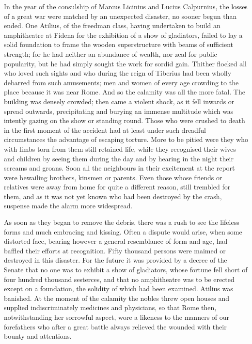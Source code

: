 In the year of the consulship of Marcus Licinius and Lucius Calpurnius, the losses of a great war were matched by an unexpected disaster, no sooner begun than ended. One Atilius, of the freedman class, having undertaken to build an amphitheatre at Fidena for the exhibition of a show of gladiators, failed to lay a solid foundation to frame the wooden superstructure with beams of sufficient strength; for he had neither an abundance of wealth, nor zeal for public popularity, but he had simply sought the work for sordid gain. Thither flocked all who loved such sights and who during the reign of Tiberius had been wholly debarred from such amusements; men and women of every age crowding to the place because it was near Rome. And so the calamity was all the more fatal. The building was densely crowded; then came a violent shock, as it fell inwards or spread outwards, precipitating and burying an immense multitude which was intently gazing on the show or standing round. Those who were crushed to death in the first moment of the accident had at least under such dreadful circumstances the advantage of escaping torture. More to be pitied were they who with limbs torn from them still retained life, while they recognised their wives and children by seeing them during the day and by hearing in the night their screams and groans. Soon all the neighbours in their excitement at the report were bewailing brothers, kinsmen or parents. Even those whose friends or relatives were away from home for quite a different reason, still trembled for them, and as it was not yet known who had been destroyed by the crash, suspense made the alarm more widespread.


As soon as they began to remove the debris, there was a rush to see the lifeless forms and much embracing and kissing. Often a dispute would arise, when some distorted face, bearing however a general resemblance of form and age, had baffled their efforts at recognition. Fifty thousand persons were maimed or destroyed in this disaster. For the future it was provided by a decree of the Senate that no one was to exhibit a show of gladiators, whose fortune fell short of four hundred thousand sesterces, and that no amphitheatre was to be erected except on a foundation, the solidity of which had been examined. Atilius was banished. At the moment of the calamity the nobles threw open houses and supplied indiscriminately medicines and physicians, so that Rome then, notwithstanding her sorrowful aspect, wore a likeness to the manners of our forefathers who after a great battle always relieved the wounded with their bounty and attentions.

